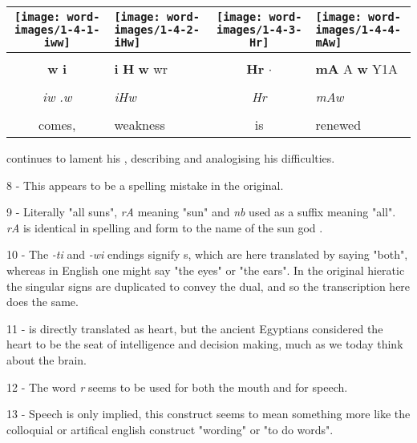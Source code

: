 \vspace{7.5mm}

\begin{tabularx}{\linewidth}{cYcY}
	\texttt{[image: word-images/1-4-1-iww]} &
	\texttt{[image: word-images/1-4-2-iHw]} &
	\texttt{[image: word-images/1-4-3-Hr]} &
	\texttt{[image: word-images/1-4-4-mAw]} \\
	\hline \\ 
	\textbf{w} \textbf{i} &
	\textbf{i} \textbf{H} \textbf{w} wr &
	\textbf{Hr} $\cdot$ &
	\textbf{mA} A \textbf{w} Y1A \\
	\hline \\ 
	\textit{iw} \textit{.w} & \textit{iHw} & \textit{Hr} & \textit{mAw} \\
	\hline \\ 
	comes, & weakness & is & renewed
\end{tabularx}

\vspace*{\fill}

\pagebreak

\vspace*{\fill}

 continues to lament his , describing and analogising his difficulties.

\vspace*{\fill}

8 - This appears to be a spelling mistake in the original.

9 - Literally "all suns", \textit{rA} meaning "sun" and \textit{nb} used as a suffix meaning "all". \textit{rA} is identical in spelling and form to the name of the sun god .

10 - The \textit{-ti} and \textit{-wi} endings signify s, which are here translated by saying "both", whereas in English one might say "the eyes" or "the ears". In the original hieratic the singular signs are duplicated to convey the dual, and so the transcription here does the same.

11 - \textit{} is directly translated as heart, but the ancient Egyptians considered the heart to be the seat of intelligence and decision making, much as we today think about the brain.

12 - The word \textit{r} seems to be used for both the mouth and for speech.

13 - Speech is only implied, this construct seems to mean something more like the colloquial or artifical english construct "wording" or "to do words".

